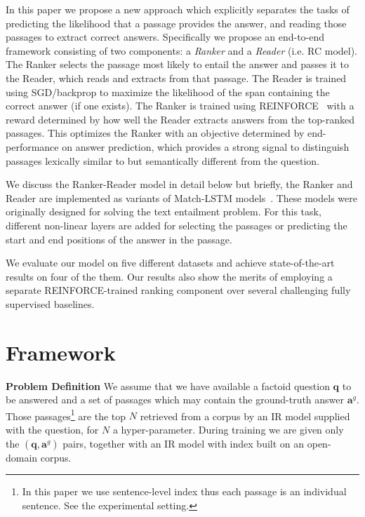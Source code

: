 \documentclass[letterpaper]{article} %
\begin{document}
In this paper we propose a new approach 
which explicitly separates the tasks of predicting the likelihood that a passage 
provides 
the answer, and reading those passages to 
extract correct answers.  Specifically we propose an end-to-end framework consisting of two components: a \textit{Ranker} and a \textit{Reader} (i.e. RC model).  The Ranker selects the passage most likely to entail the answer and passes it to the Reader, which reads and extracts from that passage. The Reader is trained using SGD/backprop to maximize the likelihood of the span containing the correct answer (if one exists). The Ranker is trained using REINFORCE~\cite{Williams1992} with a reward determined by how well the Reader extracts answers from the top-ranked passages. This optimizes the Ranker with an objective determined by end-performance on answer prediction, which provides a strong signal to distinguish passages lexically similar to but semantically different from the question.

We discuss the Ranker-Reader model in detail below but briefly, the Ranker and Reader are implemented as variants of
Match-LSTM models~\cite{wang2015learning:NAACL2016}.  These models were originally designed for solving the text entailment problem. For this task, different non-linear layers are added for selecting the passages or predicting the start and end positions of the answer in the passage. 

We evaluate our model on five different datasets and achieve state-of-the-art results on four of the them.  Our results also show the merits of employing a separate REINFORCE-trained ranking component over several challenging fully supervised baselines.


\section{Framework}

\noindent\textbf{Problem Definition}\quad
We assume that we have available a factoid question $\mathbf{q}$ to be answered and a set of passages which may contain the ground-truth answer $\mathbf{a}^g$.  Those passages\footnote{In this paper we use sentence-level index thus each passage is an individual sentence. See the experimental setting.} are the top $N$ retrieved from a corpus by an IR model supplied with the question, for $N$ a hyper-parameter.
During training we are given only the $(\mathbf{q}, \mathbf{a}^g)$ pairs, together with an IR model with index built on an open-domain corpus.\\
\end{document}
